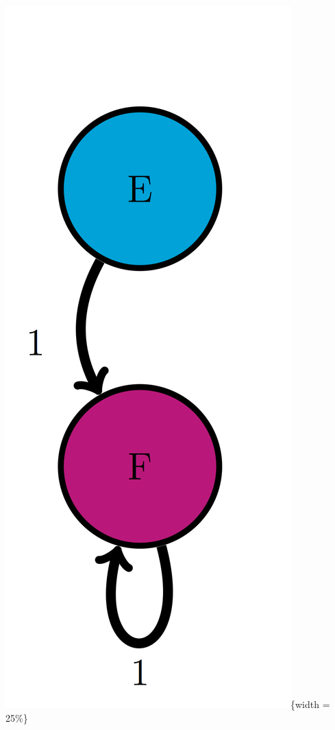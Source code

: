 \documentclass[
  letterpaper,
  DIV=11,
  numbers=noendperiod]{scrreprt}
\begin{document}
\includegraphics{./ch10/EF_trans_diag.png}\{width = 25\%\}
\end{document}
